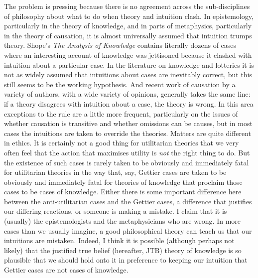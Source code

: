 \documentclass[
  11pt,
  letterpaper,
  DIV=11,
  numbers=noendperiod,
  oneside]{scrartcl}
\begin{document}
The problem is pressing because there is no agreement across the
sub-disciplines of philosophy about what to do when theory and intuition
clash. In epistemology, particularly in the theory of knowledge, and in
parts of metaphysics, particularly in the theory of causation, it is
almost universally assumed that intuition trumps theory. Shope's
\emph{The Analysis of Knowledge} contains literally dozens of cases
where an interesting account of knowledge was jettisoned because it
clashed with intuition about a particular case. In the literature on
knowledge and lotteries it is not as widely assumed that intuitions
about cases are inevitably correct, but this still seems to be the
working hypothesis. And recent work of causation by a
variety of authors, with a wide variety of opinions, generally takes the
same line: if a theory disagrees with intuition about a case, the theory
is wrong.
In this area exceptions to the rule are a little more frequent,
particularly on the issues of whether causation is transitive and
whether omissions can be causes, but in most cases the intuitions are
taken to override the theories. Matters are quite different in ethics.
It is certainly not a good thing for utilitarian theories that we very
often feel that the action that maximises utility is \emph{not} the
right thing to do. But the existence of such cases is rarely taken to be
obviously and immediately fatal for utilitarian theories in the way
that, say, Gettier cases are taken to be obviously and immediately fatal
for theories of knowledge that proclaim those cases to be cases of
knowledge. Either there is some important difference here between the
anti-utilitarian cases and the Gettier cases, a difference that
justifies our differing reactions, or someone is making a mistake. I
claim that it is (usually) the epistemologists and the metaphysicians
who are wrong. In more cases than we usually imagine, a good
philosophical theory can teach us that our intuitions are mistaken.
Indeed, I think it is possible (although perhaps not likely) that the
justified true belief (hereafter, JTB) theory of knowledge is so
plausible that we should hold onto it in preference to keeping our
intuition that Gettier cases are not cases of knowledge.
\end{document}
